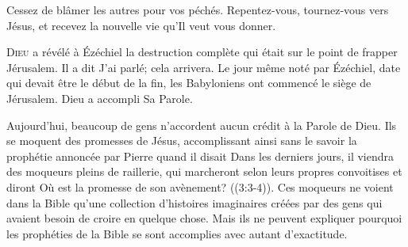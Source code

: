 Cessez de blâmer les autres pour vos péchés.
 Repentez-vous, tournez-vous vers Jésus,
 et recevez la nouvelle vie qu'Il veut vous donner. 

\dvrule







\lettrine{D}{ieu} a révélé à Ézéchiel la destruction complète
 qui était sur le point de frapper Jérusalem. Il a dit\frcolon{} 
 \Og J'ai parlé; cela arrivera. \Fg{}
 Le jour même noté par Ézéchiel, date qui devait être le début de la fin,
 les Babyloniens ont commencé le siège de Jérusalem. Dieu a accompli Sa Parole. 


Aujourd'hui, beaucoup de gens n'accordent aucun crédit à la Parole de Dieu.
 Ils se moquent des promesses de Jésus, accomplissant ainsi sans le savoir
 la prophétie annoncée par Pierre quand il disait\frcolon{} 
 \Og Dans les derniers jours, il viendra des moqueurs pleins de raillerie,
 qui marcheront selon leurs propres convoitises et diront\frcolon{}
 Où est la promesse de son avènement? \Fg{}
 ((3:3-4)).
 Ces moqueurs ne voient dans la Bible qu'une collection d'histoires imaginaires
 créées par des gens qui avaient besoin de croire en quelque chose.
 Mais ils ne peuvent expliquer pourquoi les prophéties de la Bible
 se sont accomplies avec autant d'exactitude. 

